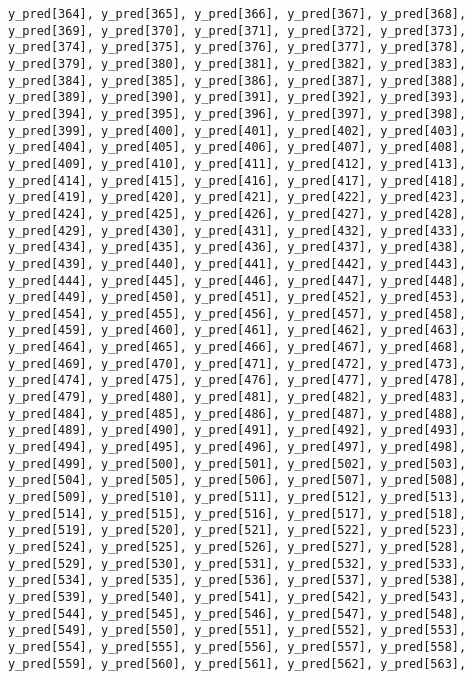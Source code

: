 \documentclass[
  letterpaper,
  DIV=11,
  numbers=noendperiod]{scrartcl}
\begin{document}
\begin{verbatim}
y_pred[364], y_pred[365], y_pred[366], y_pred[367], y_pred[368],
y_pred[369], y_pred[370], y_pred[371], y_pred[372], y_pred[373],
y_pred[374], y_pred[375], y_pred[376], y_pred[377], y_pred[378],
y_pred[379], y_pred[380], y_pred[381], y_pred[382], y_pred[383],
y_pred[384], y_pred[385], y_pred[386], y_pred[387], y_pred[388],
y_pred[389], y_pred[390], y_pred[391], y_pred[392], y_pred[393],
y_pred[394], y_pred[395], y_pred[396], y_pred[397], y_pred[398],
y_pred[399], y_pred[400], y_pred[401], y_pred[402], y_pred[403],
y_pred[404], y_pred[405], y_pred[406], y_pred[407], y_pred[408],
y_pred[409], y_pred[410], y_pred[411], y_pred[412], y_pred[413],
y_pred[414], y_pred[415], y_pred[416], y_pred[417], y_pred[418],
y_pred[419], y_pred[420], y_pred[421], y_pred[422], y_pred[423],
y_pred[424], y_pred[425], y_pred[426], y_pred[427], y_pred[428],
y_pred[429], y_pred[430], y_pred[431], y_pred[432], y_pred[433],
y_pred[434], y_pred[435], y_pred[436], y_pred[437], y_pred[438],
y_pred[439], y_pred[440], y_pred[441], y_pred[442], y_pred[443],
y_pred[444], y_pred[445], y_pred[446], y_pred[447], y_pred[448],
y_pred[449], y_pred[450], y_pred[451], y_pred[452], y_pred[453],
y_pred[454], y_pred[455], y_pred[456], y_pred[457], y_pred[458],
y_pred[459], y_pred[460], y_pred[461], y_pred[462], y_pred[463],
y_pred[464], y_pred[465], y_pred[466], y_pred[467], y_pred[468],
y_pred[469], y_pred[470], y_pred[471], y_pred[472], y_pred[473],
y_pred[474], y_pred[475], y_pred[476], y_pred[477], y_pred[478],
y_pred[479], y_pred[480], y_pred[481], y_pred[482], y_pred[483],
y_pred[484], y_pred[485], y_pred[486], y_pred[487], y_pred[488],
y_pred[489], y_pred[490], y_pred[491], y_pred[492], y_pred[493],
y_pred[494], y_pred[495], y_pred[496], y_pred[497], y_pred[498],
y_pred[499], y_pred[500], y_pred[501], y_pred[502], y_pred[503],
y_pred[504], y_pred[505], y_pred[506], y_pred[507], y_pred[508],
y_pred[509], y_pred[510], y_pred[511], y_pred[512], y_pred[513],
y_pred[514], y_pred[515], y_pred[516], y_pred[517], y_pred[518],
y_pred[519], y_pred[520], y_pred[521], y_pred[522], y_pred[523],
y_pred[524], y_pred[525], y_pred[526], y_pred[527], y_pred[528],
y_pred[529], y_pred[530], y_pred[531], y_pred[532], y_pred[533],
y_pred[534], y_pred[535], y_pred[536], y_pred[537], y_pred[538],
y_pred[539], y_pred[540], y_pred[541], y_pred[542], y_pred[543],
y_pred[544], y_pred[545], y_pred[546], y_pred[547], y_pred[548],
y_pred[549], y_pred[550], y_pred[551], y_pred[552], y_pred[553],
y_pred[554], y_pred[555], y_pred[556], y_pred[557], y_pred[558],
y_pred[559], y_pred[560], y_pred[561], y_pred[562], y_pred[563],

\end{verbatim}
\end{document}
